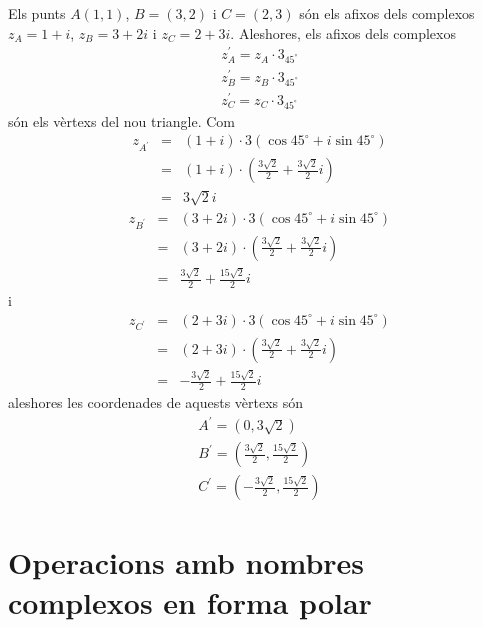 \begin{solucio}
Els punts $A(1,1)$, $B=(3,2)$ i $C=(2,3)$ són els afixos dels complexos $
z_{A}=1+i$, $z_{B}=3+2i$ i $z_{C}=2+3i$. Aleshores, els afixos dels
complexos
\begin{equation*}
\begin{array}{l}
z_{A}^{\prime }=z_{A}\cdot 3_{45
^{\circ}
} \\
z_{B}^{\prime }=z_{B}\cdot 3_{45
^{\circ}
} \\
z_{C}^{\prime }=z_{C}\cdot 3_{45
^{\circ}
}
\end{array}
\end{equation*}
són els vèrtexs del nou triangle. Com
\begin{eqnarray*}
z_{A^{\prime }} &=&(1+i)\cdot 3(\cos 45
^{\circ}
+i\sin 45
^{\circ}
) \\
&=&(1+i)\cdot \left( \frac{3\sqrt{2}}{2}+\frac{3\sqrt{2}}{2}i\right) \\
&=&3\sqrt{2}i
\end{eqnarray*}
\begin{eqnarray*}
z_{B^{\prime }} &=&(3+2i)\cdot 3(\cos 45
^{\circ}
+i\sin 45
^{\circ}
) \\
&=&(3+2i)\cdot \left( \frac{3\sqrt{2}}{2}+\frac{3\sqrt{2}}{2}i\right) \\
&=&\frac{3\sqrt{2}}{2}+\frac{15\sqrt{2}}{2}i
\end{eqnarray*}
i
\begin{eqnarray*}
z_{C^{\prime }} &=&(2+3i)\cdot 3(\cos 45
^{\circ}
+i\sin 45
^{\circ}
) \\
&=&(2+3i)\cdot \left( \frac{3\sqrt{2}}{2}+\frac{3\sqrt{2}}{2}i\right) \\
&=&-\frac{3\sqrt{2}}{2}+\frac{15\sqrt{2}}{2}i
\end{eqnarray*}
aleshores les coordenades de aquests vèrtexs són
\begin{equation*}
\begin{array}{l}
A^{\prime }=\left( 0,3\sqrt{2}\right) \\
B^{\prime }=\left( \frac{3\sqrt{2}}{2},\frac{15\sqrt{2}}{2}\right) \\
C^{\prime }=\left( -\frac{3\sqrt{2}}{2},\frac{15\sqrt{2}}{2}\right)
\end{array}
\end{equation*}
\end{solucio}

\section{Operacions amb nombres complexos en forma polar}

